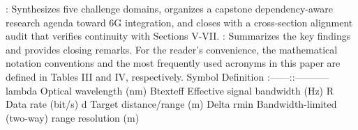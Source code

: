 \markdownRendererUlItem {}: Synthesizes five challenge domains, organizes a capstone dependency-aware research agenda toward 6G integration, and closes with a cross-section alignment audit that verifies continuity with Sections V-VII.\markdownRendererUlItemEnd 
\markdownRendererUlItem {}: Summarizes the key findings and provides closing remarks.\markdownRendererUlItemEnd 
\markdownRendererUlEnd \markdownRendererInterblockSeparator
{}
\markdownRendererSectionEnd \markdownRendererSectionBegin
{}\markdownRendererInterblockSeparator
{}For the reader's convenience, the mathematical notation conventions and the most frequently used acronyms in this paper are defined in Tables III and IV, respectively.\markdownRendererInterblockSeparator
{}\markdownRendererSectionBegin
{}\markdownRendererInterblockSeparator
{}\markdownRendererPipe{} Symbol \markdownRendererPipe{} Definition \markdownRendererPipe{}\markdownRendererSoftLineBreak
{}\markdownRendererPipe{}:------:\markdownRendererPipe{}:-----------\markdownRendererPipe{}\markdownRendererSoftLineBreak
{}\markdownRendererPipe{} \markdownRendererDollarSign{}\markdownRendererBackslash{}lambda\markdownRendererDollarSign{} \markdownRendererPipe{} Optical wavelength (nm) \markdownRendererPipe{}\markdownRendererSoftLineBreak
{}\markdownRendererPipe{} \markdownRendererDollarSign{}B\markdownRendererUnderscore{}\markdownRendererLeftBrace{}\markdownRendererBackslash{}text\markdownRendererLeftBrace{}eff\markdownRendererRightBrace{}\markdownRendererRightBrace{}\markdownRendererDollarSign{} \markdownRendererPipe{} Effective signal bandwidth (Hz) \markdownRendererPipe{}\markdownRendererSoftLineBreak
{}\markdownRendererPipe{} \markdownRendererDollarSign{}R\markdownRendererDollarSign{} \markdownRendererPipe{} Data rate (bit/s) \markdownRendererPipe{}\markdownRendererSoftLineBreak
{}\markdownRendererPipe{} \markdownRendererDollarSign{}d\markdownRendererDollarSign{} \markdownRendererPipe{} Target distance/range (m) \markdownRendererPipe{}\markdownRendererSoftLineBreak
{}\markdownRendererPipe{} \markdownRendererDollarSign{}\markdownRendererBackslash{}Delta r\markdownRendererUnderscore{}\markdownRendererLeftBrace{}\markdownRendererBackslash{}min\markdownRendererRightBrace{}\markdownRendererDollarSign{} \markdownRendererPipe{} Bandwidth-limited (two-way) range resolution (m) \markdownRendererPipe{}\markdownRendererSoftLineBreak
